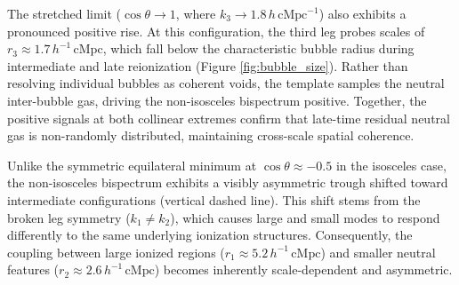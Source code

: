 \documentclass[apj,twocolumn, appendixfloats, twocolappendix, numberedappendix, tighten]{openjournal}
\begin{document}
The stretched limit ($\cos\theta \to 1$, where $k_3 \to 1.8\,h\,\mathrm{cMpc}^{-1}$) also exhibits a pronounced positive rise. At this configuration, the third leg probes scales of $r_3 \approx 1.7\,h^{-1}\,\mathrm{cMpc}$, which fall below the characteristic bubble radius during intermediate and late reionization (Figure \ref{fig:bubble_size}). Rather than resolving individual bubbles as coherent voids, the template samples the neutral inter-bubble gas, driving the non-isosceles bispectrum positive. Together, the positive signals at both collinear extremes confirm that late-time residual neutral gas is non-randomly distributed, maintaining cross-scale spatial coherence.




Unlike the symmetric equilateral minimum at $\cos\theta \approx -0.5$ in the isosceles case, the non-isosceles bispectrum exhibits a visibly asymmetric trough shifted toward intermediate configurations (vertical dashed line). This shift stems from the broken leg symmetry ($k_1 \neq k_2$), which causes large and small modes to respond differently to the same underlying ionization structures. Consequently, the coupling between large ionized regions ($r_1 \approx 5.2\,h^{-1}\,\mathrm{cMpc}$) and smaller neutral features ($r_2 \approx 2.6\,h^{-1}\,\mathrm{cMpc}$) becomes inherently scale-dependent and asymmetric.


\end{document}

